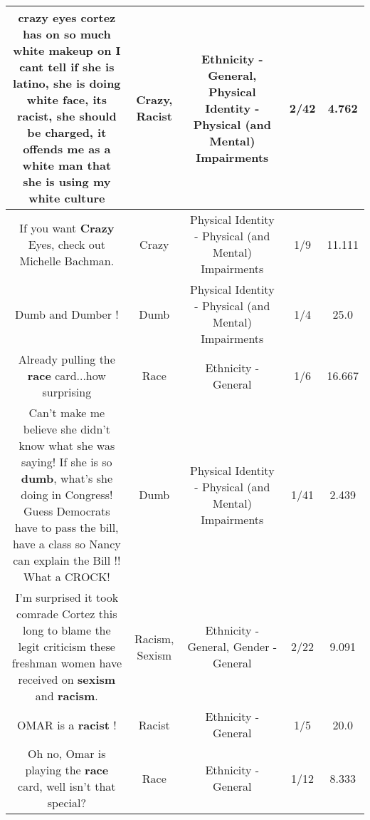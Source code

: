 \documentclass[11pt]{article}
\newlength\mylength
\begin{document}
\begin{center}
\begin{longtable}{|C{.65\mylength}|C{.30\mylength}|C{.12\mylength}|C{.12\mylength}|C{.12\mylength}|}
  \small crazy eyes cortez has on so much white makeup on I cant tell if she is latino,  she is doing white face,  its \textbf{racist},   she should be charged,  it offends me as a white man that she is using my white culture\normalsize   & Crazy, Racist & Ethnicity - General, Physical Identity - Physical (and Mental) Impairments & 2/42 & 4.762 \\  \hline
  \small If you want \textbf{Crazy} Eyes, check out Michelle Bachman.\normalsize   & Crazy & Physical Identity - Physical (and Mental) Impairments & 1/9 & 11.111 \\  \hline
  \small Dumb and Dumber !\normalsize   & Dumb & Physical Identity - Physical (and Mental) Impairments & 1/4 & 25.0 \\  \hline
  \small Already pulling the \textbf{race} card...how surprising\normalsize   & Race & Ethnicity - General & 1/6 & 16.667 \\  \hline
  \small Can't make me believe she didn't know what she was saying! If she is so \textbf{dumb}, what's she doing in Congress! Guess Democrats have to pass the bill, have a class so Nancy can explain the Bill !! What a CROCK!\normalsize   & Dumb & Physical Identity - Physical (and Mental) Impairments & 1/41 & 2.439 \\  \hline
  \small I'm surprised it took comrade Cortez this long to blame the legit criticism these freshman women have received on \textbf{sexism} and \textbf{racism}.\normalsize   & Racism, Sexism & Ethnicity - General, Gender - General & 2/22 & 9.091 \\  \hline
  \small OMAR is a \textbf{racist} !\normalsize   & Racist & Ethnicity - General & 1/5 & 20.0 \\  \hline
  \small Oh no, Omar is playing the \textbf{race} card, well isn't that special?\normalsize   & Race & Ethnicity - General & 1/12 & 8.333 \\  \hline

\end{longtable}
\end{center}
\end{document}
